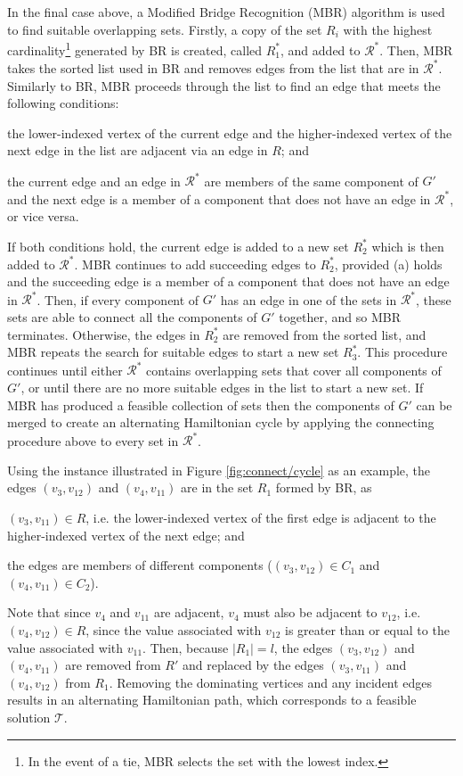 \documentclass[runningheads]{llncs}
\begin{document}
\noindent  In the final case above, a Modified Bridge Recognition (MBR) algorithm is used to find suitable overlapping sets. Firstly, a copy of the set $R_i$ with the highest cardinality\footnote{In the event of a tie, MBR selects the set with the lowest index.} generated by BR is created, called $R^{*}_1$, and added to $\mathcal{R}^{*}$. Then, MBR takes the sorted list used in BR and removes edges from the list that are in $\mathcal{R}^{*}$. Similarly to BR, MBR proceeds through the list to find an edge that meets the following conditions:
\begin{enumerate*}[label={(\alph*)}]
	\item the lower-indexed vertex of the current edge and the higher-indexed vertex of the next edge in the list are adjacent via an edge in $R$; and
	\item the current edge and an edge in $\mathcal{R}^{*}$ are members of the same component of $G'$ and the next edge is a member of a component that does not have an edge in $\mathcal{R}^{*}$, or vice versa.
\end{enumerate*}
If both conditions hold, the current edge is added to a new set $R^{*}_2$ which is then added to $\mathcal{R}^{*}$. MBR continues to add succeeding edges to $R^{*}_2$, provided (a) holds and the succeeding edge is a member of a component that does not have an edge in $\mathcal{R}^{*}$. Then, if every component of $G'$ has an edge in one of the sets in $\mathcal{R}^{*}$, these sets are able to connect all the components of $G'$ together, and so MBR terminates. Otherwise, the edges in $R^{*}_2$ are removed from the sorted list, and MBR repeats the search for suitable edges to start a new set $R^{*}_3$. This procedure continues until either $\mathcal{R}^{*}$ contains overlapping sets that cover all components of $G'$, or until there are no more suitable edges in the list to start a new set. If MBR has produced a feasible collection of sets then the components of $G'$ can be merged to create an alternating Hamiltonian cycle by applying the connecting procedure above to every set in $\mathcal{R}^{*}$.


Using the instance illustrated in Figure \ref{fig:connect/cycle} as an example, the edges $(v_3, v_{12})$ and $(v_4, v_{11})$ are in the set $R_1$ formed by BR, as \begin{enumerate*}[label={(\alph*)}]
	\item $(v_3, v_{11}) \in R$, i.e. the lower-indexed vertex of the first edge is adjacent to the higher-indexed vertex of the next edge; and
	\item the edges are members of different components ($(v_3, v_{12}) \in C_1$ and $(v_4, v_{11}) \in C_2$).
\end{enumerate*}
Note that since $v_4$ and $v_{11}$ are adjacent, $v_4$ must also be adjacent to $v_{12}$, i.e. $(v_4, v_{12}) \in R$, since the value associated with $v_{12}$ is greater than or equal to the value associated with $v_{11}$. Then, because $|R_1| = l$, the edges $(v_3, v_{12})$ and $(v_4, v_{11})$ are removed from $R'$ and replaced by the edges $(v_3, v_{11})$ and $(v_4, v_{12})$ from $R_1$. Removing the dominating vertices and any incident edges results in an alternating Hamiltonian path, which corresponds to a feasible solution $\mathcal{T}$. 
\end{document}
